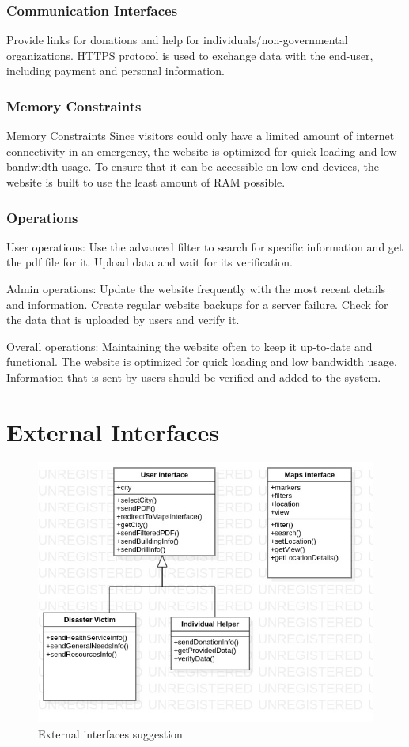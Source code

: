 \documentclass[12pt]{report}
\begin{document}
\subsubsection{Communication Interfaces}
Provide links for donations and help for individuals/non-governmental organizations. HTTPS protocol is used to exchange data with the end-user, including payment and personal information.

\subsubsection{Memory Constraints}
Memory Constraints Since visitors could only have a limited amount of internet connectivity in an emergency, the website is optimized for quick loading and low bandwidth usage. To ensure that it can be accessible on low-end devices, the website is built to use the least amount of RAM possible.

\subsubsection{Operations}
User operations: Use the advanced filter to search for specific information and get the pdf file for it. Upload data and wait for its verification.

Admin operations: Update the website frequently with the most recent details and information. Create regular website backups for a server failure. Check for the data that is uploaded by users and verify it.

Overall operations: Maintaining the website often to keep it up-to-date and functional. The website is optimized for quick loading and low bandwidth usage. Information that is sent by users should be verified and added to the system.

\section{External Interfaces}
\begin{figure}[H]
    \includegraphics[scale=0.5]{ext2}
    \centering
    \caption{External interfaces suggestion}
\end{figure}
\end{document}
